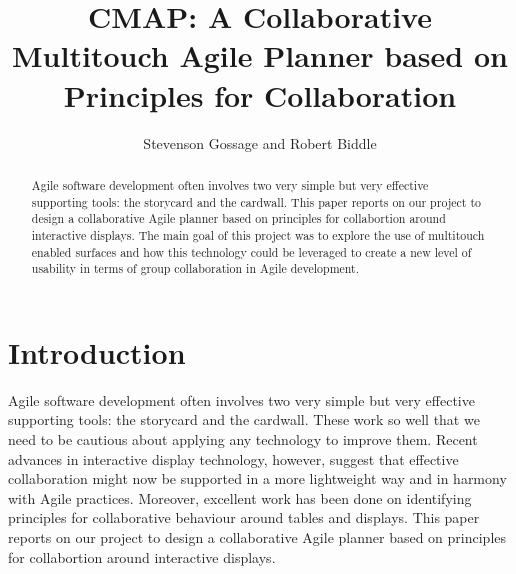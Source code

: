 \documentclass[lnbip,sechang,a4paper]{svmultln}
\begin{document}
\mainmatter  

\title{CMAP: A Collaborative Multitouch Agile Planner based on Principles for Collaboration}



\author{Stevenson Gossage and Robert Biddle}  


\maketitle

\begin{abstract}

  Agile software development often involves two very simple but very
  effective supporting tools: the storycard and the cardwall.  This
  paper reports on our project to design a collaborative Agile planner
  based on principles for collabortion around interactive displays.
  The main goal of this project was to explore the use of multitouch
  enabled surfaces and how this technology could be leveraged to
  create a new level of usability in terms of group collaboration in
  Agile development. 

\end{abstract}



\section{Introduction}

Agile software development often involves two very simple but very
effective supporting tools: the storycard and the cardwall. These work
so well that we need to be cautious about applying any technology to
improve them. Recent advances in interactive display technology,
however, suggest that effective collaboration might now be supported
in a more lightweight way and in harmony with Agile
practices. Moreover, excellent work has been done on identifying
principles for collaborative behaviour around tables and displays.
This paper reports on our project to design a collaborative Agile
planner based on principles for collabortion around interactive
displays.
\end{document}
